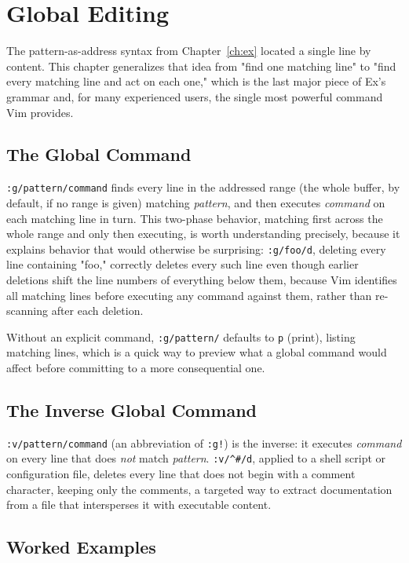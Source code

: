 \chapter{Global Editing}
\label{ch:global}

The pattern-as-address syntax from Chapter~\ref{ch:ex} located a single line by content. This chapter generalizes that idea from "find one matching line" to "find every matching line and act on each one," which is the last major piece of Ex's grammar and, for many experienced users, the single most powerful command Vim provides.

\section{The Global Command}

\texttt{:g/pattern/command} finds every line in the addressed range (the whole buffer, by default, if no range is given) matching \textit{pattern}, and then executes \textit{command} on each matching line in turn. This two-phase behavior, matching first across the whole range and only then executing, is worth understanding precisely, because it explains behavior that would otherwise be surprising: \texttt{:g/foo/d}, deleting every line containing "foo," correctly deletes every such line even though earlier deletions shift the line numbers of everything below them, because Vim identifies all matching lines before executing any command against them, rather than re-scanning after each deletion.

Without an explicit command, \texttt{:g/pattern/} defaults to \texttt{p} (print), listing matching lines, which is a quick way to preview what a global command would affect before committing to a more consequential one.

\section{The Inverse Global Command}

\texttt{:v/pattern/command} (an abbreviation of \texttt{:g!}) is the inverse: it executes \textit{command} on every line that does \textit{not} match \textit{pattern}. \texttt{:v/\textasciicircum\#/d}, applied to a shell script or configuration file, deletes every line that does not begin with a comment character, keeping only the comments, a targeted way to extract documentation from a file that intersperses it with executable content.

\section{Worked Examples}

